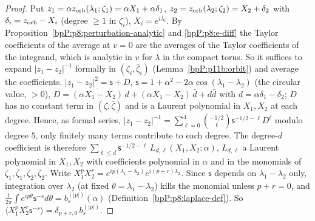 \begin{proof}
\label{stepP:p11b:pj-formal} Put $z_1=\alpha z_{\rm orb}(\lambda_1;\zeta_1)=\alpha X_1+\alpha\delta_1$, $z_2=z_{\rm orb}(\lambda_2;\zeta_2)=X_2+\delta_2$ with $\delta_i=z_{\rm orb}-X_i$ (degree $\ge1$ in $\zeta_i$), $X_i=e^{i\lambda_i}$. By Proposition~\ref{bpP:p8:perturbation-analytic} and \ref{bpP:p8:e-diff} the Taylor coefficients of the average at $v=0$ are the averages of the Taylor coefficients of the integrand, which is analytic in $v$ for $\lambda$ in the compact torus. So it suffices to expand $|z_1-z_2|^{-1}$ formally in $(\zeta_i,\bar\zeta_i)$ (Lemma~\ref{bpP:p11b:orbit}) and average the coefficients.
\label{stepP:p11b:pj-bin} $|z_1-z_2|^2=\mathsf s+D$, $\mathsf s=1+\alpha^2-2\alpha\cos(\lambda_1-\lambda_2)$ (the circular value, $>0$), $D=\overline{(\alpha X_1-X_2)}\,d+(\alpha X_1-X_2)\,\bar d+d\bar d$ with $d=\alpha\delta_1-\delta_2$; $D$ has no constant term in $(\zeta,\bar\zeta)$ and is a Laurent polynomial in $X_1,X_2$ at each degree. Hence, as formal series, $|z_1-z_2|^{-1}=\sum_{\ell=0}^4\binom{-1/2}{\ell}\mathsf s^{-1/2-\ell}D^\ell$ modulo degree $5$, only finitely many terms contribute to each degree. The degree-$d$ coefficient is therefore $\sum_{\ell\le d}\mathsf s^{-1/2-\ell}\,L_{d,\ell}(X_1,X_2;\alpha)$, $L_{d,\ell}$ a Laurent polynomial in $X_1,X_2$ with coefficients polynomial in $\alpha$ and in the monomials of $\zeta_1,\bar\zeta_1,\zeta_2,\bar\zeta_2$.
\label{stepP:p11b:pj-avg} Write $X_1^pX_2^r=e^{ip(\lambda_1-\lambda_2)}e^{i(p+r)\lambda_2}$. Since $\mathsf s$ depends on $\lambda_1-\lambda_2$ only, integration over $\lambda_2$ (at fixed $\theta=\lambda_1-\lambda_2$) kills the monomial unless $p+r=0$, and $\frac1{2\pi}\int e^{ip\theta}\mathsf s^{-s}d\theta=b_s^{(|p|)}(\alpha)$ (Definition~\ref{bpP:p8:laplace-def}). So $\langle X_1^pX_2^r\mathsf s^{-s}\rangle=\delta_{p+r,0}\,b_s^{(|p|)}$.

\end{proof}
